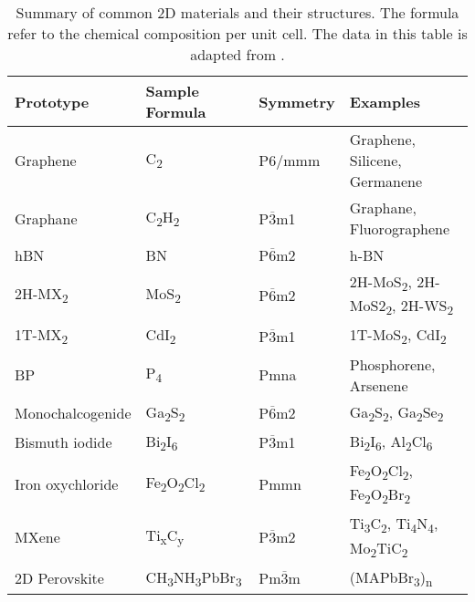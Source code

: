\begin{table}[htbp]
  \centering
  \caption{Summary of common 2D materials and their structures. The
    formula refer to the chemical composition per unit cell. The data
    in this table is adapted from \autocite{Haastrup_2018_database}.}
  \label{tab:category-2D}
  \begin{tabularx}{1.00\textwidth}{XXXX}
    \hline
    Prototype  & Sample Formula  & Symmetry & Examples \\
    \hline
    Graphene & C\textsubscript{2} &  P6/mmm & Graphene, Silicene, Germanene \\
    Graphane & C\textsubscript{2}H\textsubscript{2} &  P$\overline{3}$m1 & Graphane, Fluoro\-graphene\\
    hBN      & BN                & P$\overline{6}$m2 & h-BN \\
    2H-MX\textsubscript{2} & MoS\textsubscript{2} & P$\overline{6}$m2 & 2H-MoS\textsubscript{2}, 2H-MoS2\textsubscript{2}, 2H-WS\textsubscript{2} \\
    1T-MX\textsubscript{2} & CdI\textsubscript{2} & P$\overline{3}$m1 & 1T-MoS\textsubscript{2}, CdI\textsubscript{2}\\
    BP & P\textsubscript{4} & Pmna & Phosphorene, Arsenene \\
    Mono\-chalcogenide & Ga\textsubscript{2}S\textsubscript{2} & P$\overline{6}$m2 & Ga\textsubscript{2}S\textsubscript{2}, Ga\textsubscript{2}Se\textsubscript{2} \\
    Bismuth iodide &  Bi\textsubscript{2}I\textsubscript{6} & P$\overline{3}$m1 & Bi\textsubscript{2}I\textsubscript{6}, Al\textsubscript{2}Cl\textsubscript{6} \\
    Iron oxychloride                &  Fe\textsubscript{2}O\textsubscript{2}Cl\textsubscript{2} & Pmmn & Fe\textsubscript{2}O\textsubscript{2}Cl\textsubscript{2}, Fe\textsubscript{2}O\textsubscript{2}Br\textsubscript{2}  \\
    MXene & Ti\textsubscript{x}C\textsubscript{y} & P$\overline{3}$m2 & Ti\textsubscript{3}C\textsubscript{2}, Ti\textsubscript{4}N\textsubscript{4}, Mo\textsubscript{2}TiC\textsubscript{2} \\
    2D Perovskite & CH\textsubscript{3}NH\textsubscript{3}PbBr\textsubscript{3} & Pm$\overline{3}$m & (MAPbBr\textsubscript{3})\textsubscript{n}\\
   \hline
\end{tabularx}
\end{table}

